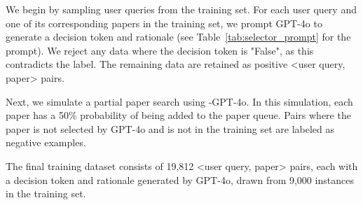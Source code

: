 \begin{table*}[htbp]

\centering
{}
\caption{Results on 100-sample subset of \autoS test.}
\label{main_results_100}
\vspace{-0.2cm}
\end{table*}

We begin by sampling user queries from the \autoS training set. For each user query and one of its corresponding papers in the \autoS training set, we prompt GPT-4o to generate a decision token and rationale (see Table~\ref{tab:selector_prompt} for the prompt). We reject any data where the decision token is "False", as this contradicts the \autoS label. The remaining data are retained as positive <user query, paper> pairs.

Next, we simulate a partial paper search using \pasa-GPT-4o. In this simulation, each paper has a 50\% probability of being added to the paper queue. Pairs where the paper is not selected by GPT-4o and is not in the \autoS training set are labeled as negative examples.

The final training dataset consists of 19,812 <user query, paper> pairs, each with a decision token and rationale generated by GPT-4o, drawn from 9,000 instances in the \autoS training set.

